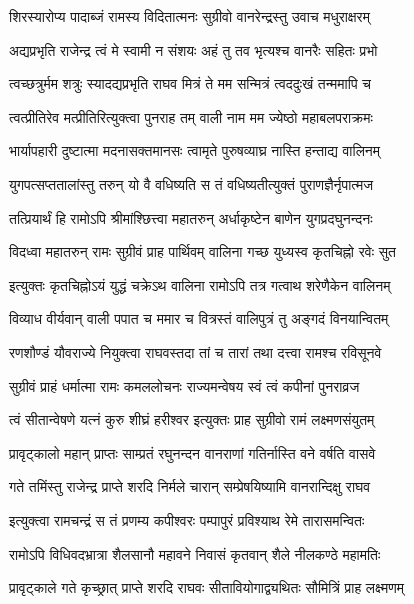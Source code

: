 \twolineshloka
{शिरस्यारोप्य पादाब्जं रामस्य विदितात्मनः}
{सुग्रीवो वानरेन्द्रस्तु उवाच मधुराक्षरम्} %

\twolineshloka
{अद्यप्रभृति राजेन्द्र त्वं मे स्वामी न संशयः}
{अहं तु तव भृत्यश्च वानरैः सहितः प्रभो} %

\twolineshloka
{त्वच्छत्रुर्मम शत्रुः स्यादद्यप्रभृति राघव}
{मित्रं ते मम सन्मित्रं त्वददुःखं तन्ममापि च} %

\twolineshloka
{त्वत्प्रीतिरेव मत्प्रीतिरित्युक्त्वा पुनराह तम्}
{वाली नाम मम ज्येष्ठो महाबलपराक्रमः} %

\twolineshloka
{भार्यापहारी दुष्टात्मा मदनासक्तमानसः}
{त्वामृते पुरुषव्याघ्र नास्ति हन्ताद्य वालिनम्} %

\twolineshloka
{युगपत्सप्ततालांस्तु तरुन् यो वै वधिष्यति}
{स तं वधिष्यतीत्युक्तं पुराणज्ञैर्नृपात्मज} %

\twolineshloka
{तत्प्रियार्थं हि रामोऽपि श्रीमांश्छित्त्वा महातरुन्}
{अर्धाकृष्टेन बाणेन युगप्रदघुनन्दनः} %

\twolineshloka
{विदध्वा महातरुन् रामः सुग्रीवं प्राह पार्थिवम्}
{वालिना गच्छ युध्यस्व कृतचिह्नो रवेः सुत} %

\twolineshloka
{इत्युक्तः कृतचिह्नोऽयं युद्धं चक्रेऽथ वालिना}
{रामोऽपि तत्र गत्वाथ शरेणैकेन वालिनम्} %

\twolineshloka
{विव्याध वीर्यवान् वाली पपात च ममार च}
{वित्रस्तं वालिपुत्रं तु अङ्गदं विनयान्वितम्} %

\twolineshloka
{रणशौण्डं यौवराज्ये नियुक्त्वा राघवस्तदा}
{तां च तारां तथा दत्त्वा रामश्च रविसूनवे} %

\twolineshloka
{सुग्रीवं प्राहं धर्मात्मा रामः कमललोचनः}
{राज्यमन्वेषय स्वं त्वं कपीनां पुनराव्रज} %

\twolineshloka
{त्वं सीतान्वेषणे यत्नं कुरु शीघ्रं हरीश्वर}
{इत्युक्तः प्राह सुग्रीवो रामं लक्ष्मणसंयुतम्} %

\twolineshloka
{प्रावृट्कालो महान् प्राप्तः साम्प्रतं रघुनन्दन}
{वानराणां गतिर्नास्ति वने वर्षति वासवे} %

\twolineshloka
{गते तमिंस्तु राजेन्द्र प्राप्ते शरदि निर्मले}
{चारान् सम्प्रेषयिष्यामि वानरान्दिक्षु राघव} %

\twolineshloka
{इत्युक्त्वा रामचन्द्रं स तं प्रणम्य कपीश्वरः}
{पम्पापुरं प्रविश्याथ रेमे तारासमन्वितः} %

\twolineshloka
{रामोऽपि विधिवदभ्रात्रा शैलसानौ महावने}
{निवासं कृतवान् शैले नीलकण्ठे महामतिः} %

\twolineshloka
{प्रावृट्काले गते कृच्छ्रात् प्राप्ते शरदि राघवः}
{सीतावियोगाद्व्यथितः सौमित्रिं प्राह लक्ष्मणम्} %

